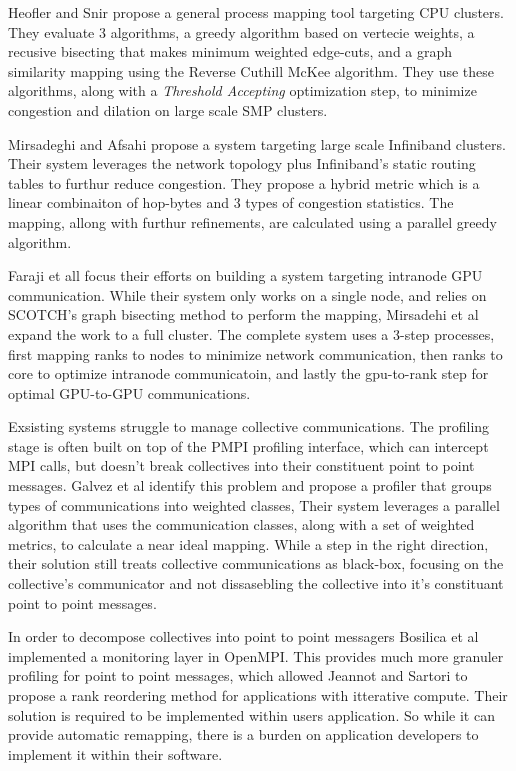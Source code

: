 Heofler and Snir \cite{Hoefler2011GenericTopoMappingStrats} propose a general process mapping tool targeting CPU clusters.
They evaluate 3 algorithms, a greedy algorithm based on vertecie weights, a recusive bisecting that makes minimum weighted edge-cuts, and a graph similarity mapping using the Reverse Cuthill McKee algorithm. 
They use these algorithms, along with a \textit{Threshold Accepting} optimization step, to minimize congestion and dilation on large scale SMP clusters.

Mirsadeghi and Afsahi \cite{Mirsadeghi2016PTRAM} propose a system targeting large scale Infiniband clusters.
Their system leverages the network topology plus Infiniband's static routing tables to furthur reduce congestion.
They propose a hybrid metric which is a linear combinaiton of hop-bytes and 3 types of congestion statistics. 
The mapping, allong with furthur refinements, are calculated using a parallel greedy algorithm.

Faraji et all \cite{Faraji2016TopoAwareGPUSelection} focus their efforts on building a system targeting intranode GPU communication.
While their system only works on a single node, and relies on SCOTCH's \cite{Pellegrini2012SCOTCH} graph bisecting method to perform the mapping, Mirsadehi et al \cite{Mirsadeghi2016MAGC} expand the work to a full cluster.
The complete system uses a 3-step processes, first mapping ranks to nodes to minimize network communication, then ranks to core to optimize intranode communicatoin, and lastly the gpu-to-rank step for optimal GPU-to-GPU communications.

Exsisting systems struggle to manage collective communications.
The profiling stage is often built on top of the PMPI profiling interface, which can intercept MPI calls, but doesn't break collectives into their constituent point to point messages.
Galvez et al \cite{Galvez2017AutoTopoMap} identify this problem and propose a profiler that groups types of communications into weighted classes, 
Their system leverages a parallel algorithm that uses the communication classes, along with a set of weighted metrics, to calculate a near ideal mapping.
While a step in the right direction, their solution still treats collective communications as black-box, focusing on the collective's communicator and not dissasebling the collective into it's constituant point to point messages.

In order to decompose collectives into point to point messagers Bosilica et al \cite{Bosilica2017OnlineMonitoringMPI} implemented a monitoring layer in OpenMPI.
This provides much more granuler profiling for point to point messages, which allowed Jeannot and Sartori \cite{Jeannot2020ImprvMPICommMonitoring} to propose a rank reordering method for applications with itterative compute.
Their solution is required to be implemented within users application. 
So while it can provide automatic remapping, there is a burden on application developers to implement it within their software.

